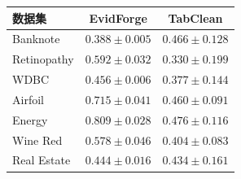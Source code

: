 \par\addvspace{6pt}\noindent\begin{minipage}{\columnwidth}
\centering
{}
\label{tab:tabclean-main}
\fontsize{8}{9.6}\selectfont
\setlength{\tabcolsep}{3pt}
\renewcommand{\arraystretch}{1.10}
\begin{tabular*}{\columnwidth}{@{\extracolsep{\fill}}lcc@{}}
\toprule
数据集 & EvidForge & TabClean \\
\midrule
Banknote & $0.388\pm0.005$ & $0.466\pm0.128$ \\
Retinopathy & $0.592\pm0.032$ & $0.330\pm0.199$ \\
WDBC & $0.456\pm0.006$ & $0.377\pm0.144$ \\
Airfoil & $0.715\pm0.041$ & $0.460\pm0.091$ \\
Energy & $0.809\pm0.028$ & $0.476\pm0.116$ \\
Wine Red & $0.578\pm0.046$ & $0.404\pm0.083$ \\
Real Estate & $0.444\pm0.016$ & $0.434\pm0.161$ \\
\bottomrule
\end{tabular*}
\end{minipage}\par\addvspace{6pt}
